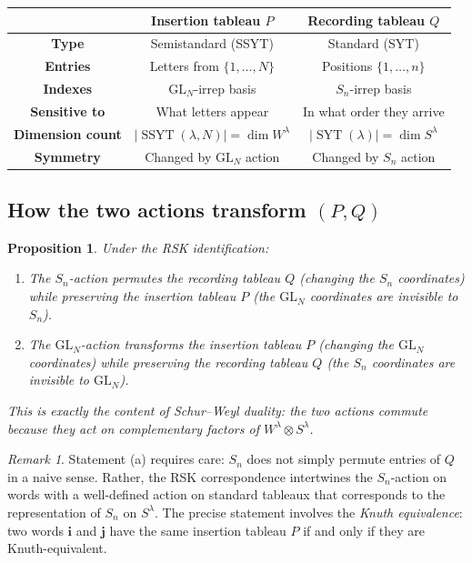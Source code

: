 \documentclass[12pt,a4paper]{article}
\newtheorem{proposition}[theorem]{Proposition}
\theoremstyle{definition}
\theoremstyle{remark}
\newtheorem{remark}[theorem]{Remark}
\newcommand{\SYT}{\operatorname{SYT}}
\newcommand{\SSYT}{\operatorname{SSYT}}
\begin{document}
\begin{center}
\renewcommand{\arraystretch}{1.4}
\begin{tabular}{c|c|c}
  & \textbf{Insertion tableau $P$}
  & \textbf{Recording tableau $Q$} \\
\hline
\textbf{Type} & Semistandard (SSYT) & Standard (SYT) \\
\textbf{Entries} & Letters from $\{1,\ldots,N\}$ & Positions $\{1,\ldots,n\}$ \\
\textbf{Indexes} & $\mathrm{GL}_N$-irrep basis & $S_n$-irrep basis \\
\textbf{Sensitive to} & What letters appear & In what order they arrive \\
\textbf{Dimension count} & $|\SSYT(\lambda,N)| = \dim W^\lambda$
  & $|\SYT(\lambda)| = \dim S^\lambda$ \\
\textbf{Symmetry} & Changed by $\mathrm{GL}_N$ action
  & Changed by $S_n$ action \\
\end{tabular}
\end{center}

\subsection{How the two actions transform $(P, Q)$}

\begin{proposition}\label{prop:actions-on-PQ}
Under the RSK identification:
\begin{enumerate}[label=(\alph*)]
\item The $S_n$-action permutes the recording tableau $Q$ (changing
  the $S_n$ coordinates) while preserving the insertion tableau $P$
  (the $\mathrm{GL}_N$ coordinates are invisible to $S_n$).
\item The $\mathrm{GL}_N$-action transforms the insertion tableau $P$
  (changing the $\mathrm{GL}_N$ coordinates) while preserving the
  recording tableau $Q$ (the $S_n$ coordinates are invisible to
  $\mathrm{GL}_N$).
\end{enumerate}
This is exactly the content of Schur--Weyl duality: the two actions
commute because they act on complementary factors of $W^\lambda
\otimes S^\lambda$.
\end{proposition}

\begin{remark}
Statement (a) requires care: $S_n$ does not simply permute entries of
$Q$ in a naive sense. Rather, the RSK correspondence intertwines the
$S_n$-action on words with a well-defined action on standard tableaux
that corresponds to the representation of $S_n$ on $S^\lambda$.
The precise statement involves the \emph{Knuth equivalence}: two words
$\mathbf{i}$ and $\mathbf{j}$ have the same insertion tableau $P$ if
and only if they are Knuth-equivalent.
\end{remark}
\end{document}
